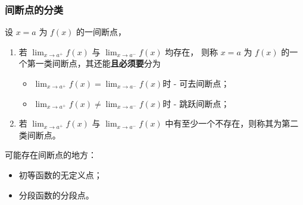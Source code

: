 \subsubsection{间断点的分类}

设 $ x=a $ 为 $ f(x) $ 的一间断点，
\begin{enumerate}
    \item 若 $ {\displaystyle\lim_{x\rightarrow a^+}}f(x) $ 与 $ {\displaystyle\lim_{x\rightarrow a^-}}f(x) $ 均存在，
    则称 $ x=a $ 为 $ f(x) $ 的一个第一类间断点，其还能\textbf{且必须要}分为\begin{itemize}
        \item $ {\displaystyle\lim_{x\rightarrow a^+}}f(x)={\displaystyle\lim_{x\rightarrow a^-}}f(x) $时 - 
        可去间断点；
        \item $ {\displaystyle\lim_{x\rightarrow a^+}}f(x)\neq{\displaystyle\lim_{x\rightarrow a^-}}f(x) $时 - 
        跳跃间断点；
    \end{itemize}
    \item 若 $ {\displaystyle\lim_{x\rightarrow a^+}}f(x) $ 与 $ {\displaystyle\lim_{x\rightarrow a^-}}f(x) $ 
    中有至少一个不存在，则称其为第二类间断点。
\end{enumerate}

可能存在间断点的地方：
\begin{itemize}
    \item 初等函数的无定义点；
    \item 分段函数的分段点。
\end{itemize}


